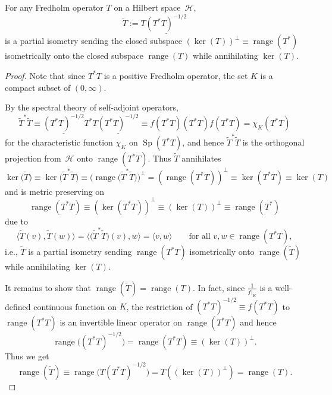 \documentclass[pdftex]{sigma}
\begin{document}
\begin{lemma}\label{Fredholm} For any Fredholm operator $T$ on a Hilbert space~$\mathcal{H}$,
\[
\tilde{T}:=T\underline{( T^{\ast}T) ^{-1/2}}
\]
is a partial isometry sending the closed subspace $( \ker(T)) ^{\perp}\equiv\operatorname{range}( T^{\ast})
$ isometrically onto the closed subspace $\operatorname{range}(T) $ while annihilating $\ker(T) $.
\end{lemma}
\begin{proof}
Note that since $T^{\ast}T$ is a positive Fredholm operator, the set
$K$ is a compact subset of $ ( 0,\infty) $.

By the spectral theory of self-adjoint operators,
\[
\tilde{T}^{\ast}\tilde{T}\equiv\underline{( T^{\ast}T) ^{-1/2}%
}T^{\ast}T\underline{( T^{\ast}T ) ^{-1/2}}\equiv f (
T^{\ast}T ) ( T^{\ast}T ) f ( T^{\ast}T )
=\chi_{K} ( T^{\ast}T )
\]
for the characteristic function $\chi_{K}$ on $\operatorname{Sp} (
T^{\ast}T ) $, and hence $\tilde{T}^{\ast}\tilde{T}$ is the orthogonal
projection from~$\mathcal{H}$ onto $\operatorname{range} ( T^{\ast}T) $. Thus $\tilde{T}$ annihilates
\[
\ker\big(\tilde{T}\big) \equiv\ker\big( \tilde{T}^{\ast}\tilde
{T}\big) \equiv\big( \operatorname{range}\big( \tilde{T}^{\ast}%
\tilde{T}\big) \big) ^{\perp}= ( \operatorname{range} (
T^{\ast}T ) ) ^{\perp}\equiv\ker ( T^{\ast}T )
\equiv\ker ( T )
\]
and is metric preserving on
\[
\operatorname{range}( T^{\ast}T) \equiv( \ker(
T^{\ast}T) ) ^{\perp}\equiv( \ker(T)
) ^{\perp}\equiv\operatorname{range}( T^{\ast})
\]
due to
\[
\big\langle \tilde{T}(v) ,\tilde{T}(w)
\big\rangle =\big\langle \big( \tilde{T}^{\ast}\tilde{T}\big) (
v) ,w\big\rangle =\langle v,w\rangle \qquad \text{for all }v,w\in\operatorname{range}( T^{\ast}T) ,
\]
i.e., $\tilde{T}$ is a partial isometry sending $\operatorname{range} (
T^{\ast}T ) $ isometrically onto $\operatorname{range} ( \tilde
{T} ) $ while annihilating $\ker ( T ) $.

It remains to show that $\operatorname{range}(\tilde{T})
=\operatorname{range}(T) $. In fact, since $\frac{1}{f|_{K}}$
is a well-defined continuous function on $K$, the restriction of $ (
T^{\ast}T ) ^{-1/2}\equiv f ( T^{\ast}T ) $ to
$\operatorname{range}( T^{\ast}T) $ is an invertible linear
operator on $\operatorname{range} ( T^{\ast}T ) $ and hence
\[
\operatorname{range}\big( ( T^{\ast}T ) ^{-1/2}\big)
=\operatorname{range} ( T^{\ast}T ) \equiv ( \ker (T )) ^{\perp}.
\]
Thus we get
\[
\operatorname{range}(\tilde{T}) \equiv\operatorname{range}
\big( T ( T^{\ast}T ) ^{-1/2}\big) =T ( (
\ker(T) ) ^{\perp} ) =\operatorname{range} (T) .\tag*{\qed}
\]
\renewcommand{\qed}{}
\end{proof}
\end{document}

